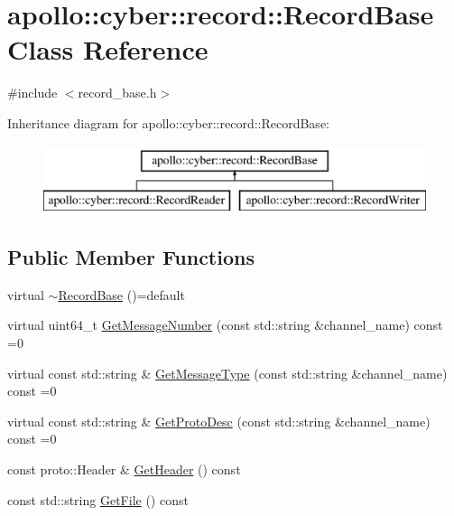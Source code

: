 \hypertarget{classapollo_1_1cyber_1_1record_1_1RecordBase}{\section{apollo\-:\-:cyber\-:\-:record\-:\-:Record\-Base Class Reference}
\label{classapollo_1_1cyber_1_1record_1_1RecordBase}
}


{\ttfamily \#include $<$record\-\_\-base.\-h$>$}

Inheritance diagram for apollo\-:\-:cyber\-:\-:record\-:\-:Record\-Base\-:\begin{figure}[H]
\begin{center}
\leavevmode
\includegraphics[height=2.000000cm]{classapollo_1_1cyber_1_1record_1_1RecordBase}
\end{center}
\end{figure}
\subsection*{Public Member Functions}
\begin{DoxyCompactItemize}
\item 
virtual \hyperlink{classapollo_1_1cyber_1_1record_1_1RecordBase_a95c06bb77a60dfc827592777030f84de}{$\sim$\-Record\-Base} ()=default
\item 
virtual uint64\-\_\-t \hyperlink{classapollo_1_1cyber_1_1record_1_1RecordBase_a82d12447e8d34553c42e4225b9359a1b}{Get\-Message\-Number} (const std\-::string \&channel\-\_\-name) const =0
\item 
virtual const std\-::string \& \hyperlink{classapollo_1_1cyber_1_1record_1_1RecordBase_ad1883d8a1ce2f90046b18eb6fd9306e3}{Get\-Message\-Type} (const std\-::string \&channel\-\_\-name) const =0
\item 
virtual const std\-::string \& \hyperlink{classapollo_1_1cyber_1_1record_1_1RecordBase_a0044d679cdfd10e56199f597446e912d}{Get\-Proto\-Desc} (const std\-::string \&channel\-\_\-name) const =0
\item 
const proto\-::\-Header \& \hyperlink{classapollo_1_1cyber_1_1record_1_1RecordBase_af627ca03e16834e5be16fdbbba9317c4}{Get\-Header} () const 
\item 
const std\-::string \hyperlink{classapollo_1_1cyber_1_1record_1_1RecordBase_ad51ac494bc2e2a5922b792558789d602}{Get\-File} () const 
\end{DoxyCompactItemize}
